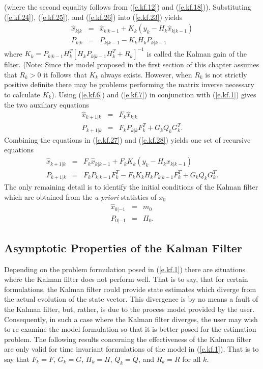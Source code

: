 %
(where the second equality follows from (\ref{e.kf.12}) and
(\ref{e.kf.18})).  Substituting (\ref{e.kf.24}),
(\ref{e.kf.25}), and (\ref{e.kf.26}) into (\ref{e.kf.23}) yields
%
\begin{eqnarray}
\hat{x}_{k|k}&=&\hat{x}_{k|k-1}+K_k(y_k-H_k\hat{x}_{k|k-1})\nonumber\\
P_{k|k}&=&P_{k|k-1}-K_kH_kP_{k|k-1}
\label{e.kf.27}
\end{eqnarray}
%
where $K_k=P_{k|k-1}H_k^T[H_kP_{k|k-1}H_k^T+R_k]^{-1}$ is called the 
Kalman gain of the filter.  (Note: Since the model proposed in
the first section of this chapter assumes that $R_k>0$ it follows that
$K_k$ always exists.  However, when $R_k$ is not strictly
positive definite there may be problems performing
the matrix inverse necessary to calculate $K_k$).
Using (\ref{e.kf.6}) and (\ref{e.kf.7}) in conjunction with (\ref{e.kf.1})
gives the two auxiliary equations
%
\begin{eqnarray}
\hat{x}_{k+1|k}&=&F_k\hat{x}_{k|k}\nonumber\\
P_{k+1|k}&=&F_kP_{k|k}F_k^T+G_kQ_kG_k^T.
\label{e.kf.28}
\end{eqnarray}
%
Combining the equations in (\ref{e.kf.27}) and (\ref{e.kf.28}) yields 
one set of recursive equations
%
\begin{eqnarray}
\hat{x}_{k+1|k}&=&F_k\hat{x}_{k|k-1}+F_kK_k(y_k-H_k\hat{x}_{k|k-1})\nonumber\\
P_{k+1|k}&=&F_kP_{k|k-1}F_k^T-F_kK_kH_kP_{k|k-1}F_k^T+G_kQ_kG_k^T.
\label{e.kf.29}
\end{eqnarray}
%
The only remaining detail is to identify the initial conditions
of the Kalman filter which are obtained from the {\it a priori}
statistics of $x_0$
%
\begin{eqnarray}
\hat{x}_{0|-1}&=&m_0\nonumber\\
P_{0|-1}&=&\Pi_0.
\label{e.kf.30}
\end{eqnarray}
%
\subsection{Asymptotic Properties of the Kalman Filter}

	Depending on the problem formulation posed
in (\ref{e.kf.1}) there are situations where the Kalman filter
does not perform well.  That is to say, that for
certain formulations, the Kalman filter could provide
state estimates which diverge from the actual evolution
of the state vector.  This divergence is by no
means a fault of the Kalman filter, but, rather,
is due to the process model provided by the user.
Consequently, in such a case where the Kalman filter
diverges, the user may wish to re-examine the
model formulation so that it
is better posed for the estimation problem.
The following results concerning the effectiveness of
the Kalman filter are only valid for time invariant
formulations of the model in (\ref{e.kf.1}).  That is to say
that $F_k=F$, $G_k=G$, $H_k=H$, $Q_k=Q$, and $R_k=R$ for all $k$.

